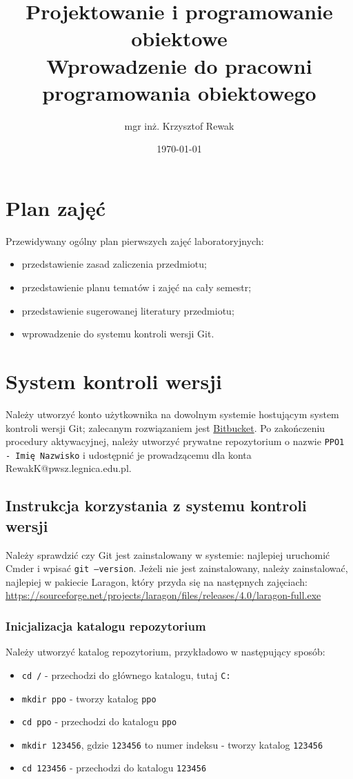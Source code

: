 \documentclass{article}
\title{
	Projektowanie i programowanie obiektowe \\
	\Huge{Wprowadzenie do pracowni programowania obiektowego}
}
\author{mgr inż. Krzysztof Rewak}
\date{\today}
\begin{document}
	\maketitle

	\section{Plan zajęć}
	Przewidywany ogólny plan pierwszych zajęć laboratoryjnych:
	\begin{itemize}
		\item przedstawienie zasad zaliczenia przedmiotu;
		\item przedstawienie planu tematów i zajęć na cały semestr;
		\item przedstawienie sugerowanej literatury przedmiotu;
		\item wprowadzenie do systemu kontroli wersji Git.
	\end{itemize}
	
	\section{System kontroli wersji}
	Należy utworzyć konto użytkownika na dowolnym systemie hostującym system kontroli wersji Git; zalecanym rozwiązaniem jest \href{https://bitbucket.org/product/}{Bitbucket}. Po zakończeniu procedury aktywacyjnej, należy utworzyć prywatne repozytorium o nazwie \texttt{PPO1 - Imię Nazwisko} i udostępnić je prowadzącemu dla konta RewakK@pwsz.legnica.edu.pl.
	
	\subsection{Instrukcja korzystania z systemu kontroli wersji}
	Należy sprawdzić czy Git jest zainstalowany w systemie: najlepiej uruchomić Cmder i wpisać \texttt{git --version}. Jeżeli nie jest zainstalowany, należy zainstalować, najlepiej w pakiecie Laragon, który przyda się na następnych zajęciach: \url{https://sourceforge.net/projects/laragon/files/releases/4.0/laragon-full.exe}
	
	\subsubsection{Inicjalizacja katalogu repozytorium}
	Należy utworzyć katalog repozytorium, przykładowo w następujący sposób:
	\begin{itemize}
		\item \texttt{cd /} - przechodzi do głównego katalogu, tutaj \texttt{C:}
		\item \texttt{mkdir ppo} - tworzy katalog \texttt{ppo}
		\item \texttt{cd ppo} - przechodzi do katalogu \texttt{ppo}
		\item \texttt{mkdir 123456}, gdzie \texttt{123456} to numer indeksu - tworzy katalog \texttt{123456}
		\item \texttt{cd 123456}  - przechodzi do katalogu \texttt{123456}
	\end{itemize}
	
\end{document}
